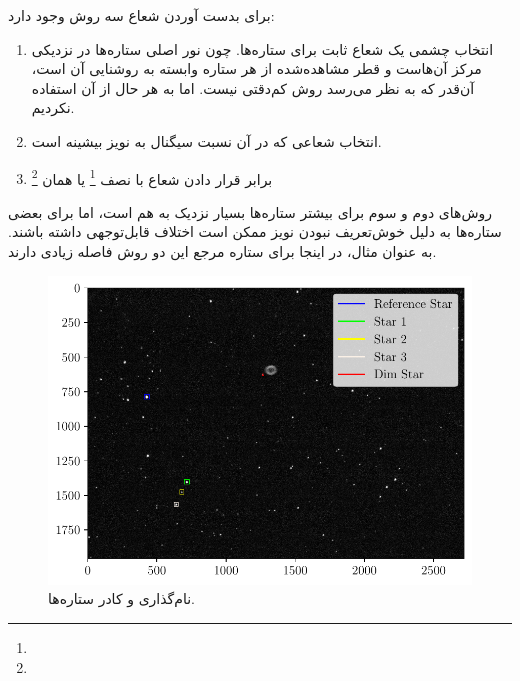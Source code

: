 \documentclass[12pt,a4paper]{article}
\begin{document}
	برای بدست آوردن شعاع سه روش وجود دارد:
	\begin{enumerate}
		\item{انتخاب چشمی یک شعاع ثابت برای ستاره‌ها. چون نور اصلی ستاره‌ها در نزدیکی مرکز آن‌هاست و قطر مشاهده‌شده از
		هر ستاره وابسته به روشنایی آن است، آن‌قدر که به نظر می‌رسد روش کم‌دقتی نیست. اما به هر حال از آن استفاده نکردیم.}
		\item{انتخاب شعاعی که در آن نسبت سیگنال به نویز بیشینه است.}
		\item{برابر قرار دادن شعاع با نصف \footnote{} یا همان
			\footnote{}}
	\end{enumerate}
	روش‌های دوم و سوم برای بیشتر ستاره‌ها بسیار نزدیک به هم است، اما برای بعضی ستاره‌ها به دلیل خوش‌تعریف نبودن
	نویز ممکن است اختلاف قابل‌توجهی داشته باشند. به عنوان مثال، در اینجا برای ستاره مرجع این دو روش فاصله زیادی دارند.
	\begin{figure}
		\centering
		\includegraphics[width=\linewidth]{../fig/crop}
		\caption{نام‌گذاری و کادر ستاره‌ها.}
	\end{figure}
	
\end{document}
